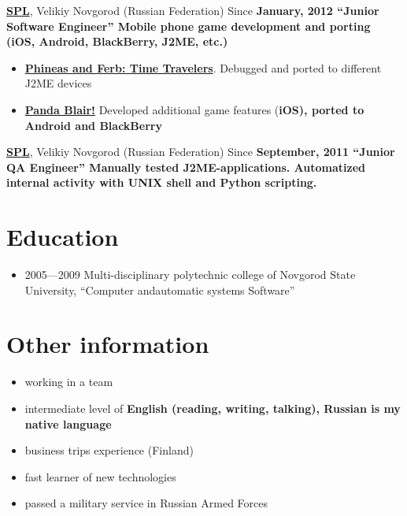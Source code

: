 {
\vspace{15pt}
\fontsize{14pt}{12pt}\selectfont
\href{http://spl.co}{\bfseries SPL\mdseries},
Velikiy Novgorod (Russian Federation)
}
\subitem Since \bfseries January, 2012 \mdseries ``Junior Software Engineer''
\subitem Mobile phone game development and porting
(iOS, Android, BlackBerry, J2ME, etc.)
\begin{itemize}
\setlength{\itemindent}{20pt}
\item
    \href{http://java.mob.org/game/phineas\_and\_ferb\_time\_travelers.html}
        {\bfseries Phineas and Ferb: Time Travelers\mdseries}.
        Debugged and ported to different J2ME devices
\item
    \href{https://itunes.apple.com/us/app/panda-blair!/id500995558?mt=8}
        {\bfseries Panda Blair!\mdseries}
        Developed additional game features (\bfseries iOS\mdseries),
        ported to \bfseries Android \mdseries and \bfseries BlackBerry\mdseries
\end{itemize}

{
\vspace{15pt}
\fontsize{14pt}{12pt}\selectfont
\href{http://spl.co}{\bfseries SPL\mdseries},
Velikiy Novgorod (Russian Federation)
}
\subitem Since \bfseries September, 2011 \mdseries ``Junior QA Engineer''
\subitem Manually tested J2ME-applications.
\subitem Automatized internal activity with
\bfseries UNIX shell \mdseries and \bfseries Python \mdseries scripting.

\section{Education}
\begin{itemize}
\item 2005---2009 Multi-disciplinary polytechnic college of
Novgorod State University,
``Computer and\linebreak automatic systems Software''
\end{itemize}

\section{Other information}
\begin{itemize}
\item working in a team
\item intermediate level of \bfseries English \mdseries (reading, writing, talking),
Russian is my native language
\item business trips experience (Finland)
\item fast learner of new technologies
\item passed a military service in Russian Armed Forces
\end{itemize}

